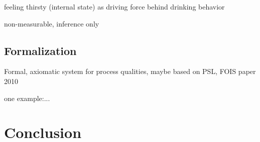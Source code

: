 \documentclass{bioinfo}
\begin{document}
feeling thirsty (internal state) as driving force behind drinking
behavior

non-measurable, inference only

\subsection{Formalization}
Formal, axiomatic system for process qualities, maybe based on PSL,
FOIS paper 2010

one example:...

\section{Conclusion}




    




 



\end{document}
